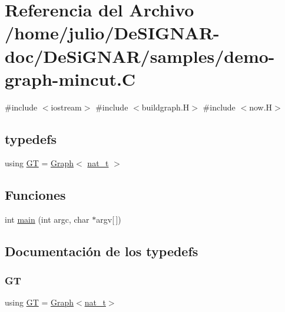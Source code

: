 \hypertarget{demo-graph-mincut_8_c}{}\section{Referencia del Archivo /home/julio/\+De\+S\+I\+G\+N\+A\+R-\/doc/\+De\+Si\+G\+N\+A\+R/samples/demo-\/graph-\/mincut.C}
\label{demo-graph-mincut_8_c}
{\ttfamily \#include $<$iostream$>$}\newline
{\ttfamily \#include $<$buildgraph.\+H$>$}\newline
{\ttfamily \#include $<$now.\+H$>$}\newline
\subsection*{typedefs}
\begin{DoxyCompactItemize}
\item 
using \hyperlink{demo-graph-mincut_8_c_a3001c40d2c31ca87ed96cd7d1334a55e}{GT} = \hyperlink{class_designar_1_1_graph}{Graph}$<$ \hyperlink{namespace_designar_aa72662848b9f4815e7bf31a7cf3e33d1}{nat\+\_\+t} $>$
\end{DoxyCompactItemize}
\subsection*{Funciones}
\begin{DoxyCompactItemize}
\item 
int \hyperlink{demo-graph-mincut_8_c_a0ddf1224851353fc92bfbff6f499fa97}{main} (int argc, char $\ast$argv\mbox{[}$\,$\mbox{]})
\end{DoxyCompactItemize}


\subsection{Documentación de los \textquotesingle{}typedefs\textquotesingle{}}
\mbox{\label{demo-graph-mincut_8_c_a3001c40d2c31ca87ed96cd7d1334a55e}} 
\subsubsection{\texorpdfstring{GT}{GT}}
{\footnotesize\ttfamily using \hyperlink{demo-buildgraph_8_c_a3001c40d2c31ca87ed96cd7d1334a55e}{GT} =  \hyperlink{class_designar_1_1_graph}{Graph}$<$\hyperlink{namespace_designar_aa72662848b9f4815e7bf31a7cf3e33d1}{nat\+\_\+t}$>$}



